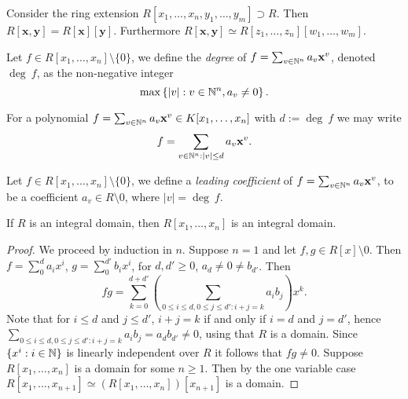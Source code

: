 \begin{corollary}
    Consider the ring extension $R[x_1,\dots,x_n,y_1,\dots,y_m]\supset R$. Then $R[\mathbf{x},\mathbf{y}]=R[\mathbf{x}][\mathbf{y}]$. Furthermore $R[\mathbf{x},\mathbf{y}]\simeq R[z_1,\dots,z_n][w_1,\dots,w_m]$.
\end{corollary}
\begin{definition}
    Let $f\in R[x_1,\dots,x_n]\setminus\{0\}$, we define the \textit{degree} of $f=\sum_{v\in \mathbb{N}^n} a_v\mathbf{x}^v$, denoted $\deg \ f$, as the non-negative integer 
    $$\max \left\{ \vert v\vert : v\in \mathbb{N}^n, a_v \neq 0 \right\}.$$
\end{definition}
\begin{remark}
    For a polynomial $f = \sum_{v\in \mathbb{N}^n} a_v\mathbf{x}^v\in K[x_1,\dots,x_n]$ with $d:= \deg\ f$ we may write 
    $$f = \sum_{v\in \mathbb{N}^n : \vert v \vert \leq d} a_v\mathbf{x}^v.$$
\end{remark}
\begin{definition}
    Let $f\in R[x_1,\dots,x_n]\setminus\{0\}$, we define a \textit{leading coefficient} of $f=\sum_{v\in \mathbb{N}^n} a_v\mathbf{x}^v$, to be a coefficient $a_v\in R\setminus 0$, where $\vert v\vert = \deg \ f$. 
\end{definition}
\begin{lemma}\label{PolynomialRingOverDomainIsDomain}
    If $R$ is an integral domain, then $R[x_1,\dots,x_n]$ is an integral domain.
\end{lemma}
\begin{proof}
    We proceed by induction in $n$. Suppose $n=1$ and let $f,g\in R[x]\setminus 0$. Then $f=\sum_0^d a_ix^i$, $g=\sum_0^{d'}b_ix^i$, for $d,d'\geq 0$, $a_d\neq0\neq b_{d'}$. Then 
    $$fg = \sum_{k=0}^{d+d'} \left(\sum_{0\leq i\leq d, 0\leq j\leq d' : i+j=k} a_ib_j\right) x^k.$$
    Note that for $i\leq d$ and $j\leq d'$, $i+j = k$ if and only if $i=d$ and $j=d'$, hence
    $\sum_{0\leq i\leq d, 0\leq j\leq d' : i+j=k} a_ib_j = a_db_{d'} \neq 0$, using that $R$ is a domain. Since $\{x^i : i\in\mathbb{N}\}$ is linearly independent over $R$ it follows that $fg \neq 0$.
    Suppose $R[x_1,\dots, x_n]$ is a domain for some $n\geq 1$. Then by the one variable case $R[x_1,\dots,x_{n+1}]\simeq (R[x_1,\dots,x_n])[x_{n+1}]$ is a domain. 
\end{proof}

